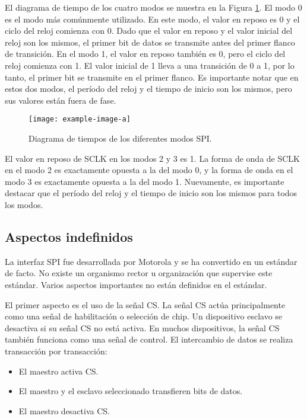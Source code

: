     El diagrama de tiempo de los cuatro modos se muestra en la Figura \ref{fig:spi_timing_diagram_modes}. El modo 0 es el modo más comúnmente utilizado. En este modo, el valor en reposo es 0 y el ciclo del reloj comienza con 0. Dado que el valor en reposo y el valor inicial del reloj son los mismos, el primer bit de datos se transmite antes del primer flanco de transición. En el modo 1, el valor en reposo también es 0, pero el ciclo del reloj comienza con 1. El valor inicial de 1 lleva a una transición de 0 a 1, por lo tanto, el primer bit se transmite en el primer flanco. Es importante notar que en estos dos modos, el período del reloj y el tiempo de inicio son los mismos, pero sus valores están fuera de fase.

    \begin{figure}[hbtp]
      \centering
      \texttt{[image: example-image-a]}
      \caption{Diagrama de tiempos de los diferentes modos SPI.}
      \label{fig:spi_timing_diagram_modes}
    \end{figure}

    El valor en reposo de SCLK en los modos 2 y 3 es 1. La forma de onda de SCLK en el modo 2 es exactamente opuesta a la del modo 0, y la forma de onda en el modo 3 es exactamente opuesta a la del modo 1. Nuevamente, es importante destacar que el período del reloj y el tiempo de inicio son los mismos para todos los modos.

    \subsection{Aspectos indefinidos}

    La interfaz SPI fue desarrollada por Motorola y se ha convertido en un estándar de facto. No existe un organismo rector u organización que supervise este estándar. Varios aspectos importantes no están definidos en el estándar.

    El primer aspecto es el uso de la señal CS. La señal CS actúa principalmente como una señal de habilitación o selección de chip. Un dispositivo esclavo se desactiva si su señal CS no está activa. En muchos dispositivos, la señal CS también funciona como una señal de control. El intercambio de datos se realiza transacción por transacción:

    \begin{itemize}
      \item El maestro activa CS.
      \item El maestro y el esclavo seleccionado transfieren bits de datos.
      \item El maestro desactiva CS.
    \end{itemize}


